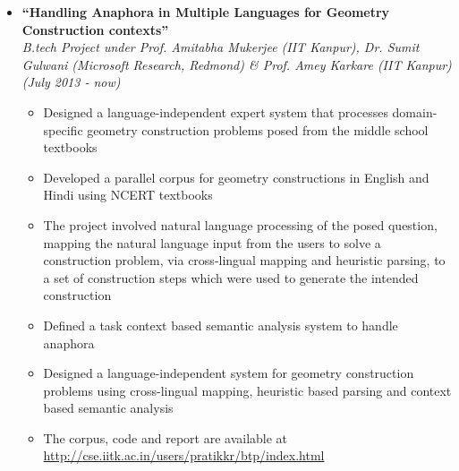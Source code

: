 \documentclass[margin,line]{resume}
\begin{document}
\begin{resume}
  \begin{itemize}
  \item \large{\textbf{\textsf{``Handling Anaphora in Multiple Languages for Geometry Construction contexts''}}}
    \\ \small{\textit{B.tech Project under Prof. Amitabha Mukerjee (IIT Kanpur), Dr. Sumit Gulwani (Microsoft Research, Redmond) \& Prof. Amey Karkare (IIT Kanpur) (July 2013 - now)}}
    \normalsize
    \begin{itemize}
    \item Designed a language-independent expert system that processes domain-specific geometry construction problems posed from the middle school textbooks
    \item Developed a parallel corpus for geometry constructions in English and Hindi using NCERT textbooks
    \item The project involved natural language processing of the posed question, mapping the natural language input from the users to solve a construction problem, via cross-lingual mapping and heuristic parsing, to a set of construction steps which were used to generate the intended construction
    \item Defined a task context based semantic analysis system to handle anaphora
    \item Designed a language-independent system for geometry construction problems using cross-lingual mapping, heuristic based parsing and context based semantic analysis
    \item The corpus, code and report are available at \url{http://cse.iitk.ac.in/users/pratikkr/btp/index.html}
    \end{itemize}


\end{itemize}
\end{resume}
\end{document}

